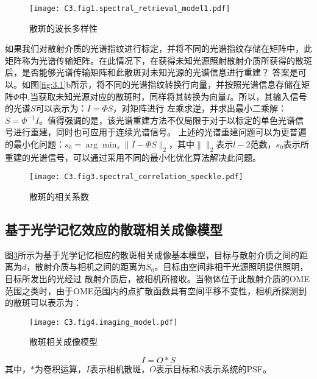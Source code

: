 \begin{figure}[htp]
	\centering
	\texttt{[image: C3.fig1.spectral\_retrieval\_model1.pdf]}
	\caption{散斑的波长多样性}
	\label{fig:3.2}
\end{figure}

如果我们对散射介质的光谱指纹进行标定，并将不同的光谱指纹存储在矩阵中，此矩阵称为光谱传输矩阵。在此情况下，在获得未知光源照射散射介质所获得的散斑后，是否能够光谱传输矩阵和此散斑对未知光源的光谱信息进行重建？
答案是可以。如图\ref{fig:3.1}b所示，将不同的光谱指纹转换行向量，并按照光谱信息存储在矩阵$\Phi$中,当获取未知光源对应的散斑时，同样将其转换为向量$I$。所以，其输入信号的光谱$S$可以表示为：$I={\Phi}S$，对矩阵进行
左乘求逆，并求出最小二乘解：$S={\Phi}^{-1}I$。值得强调的是，该光谱重建方法不仅局限于对于以标定的单色光谱信号进行重建，同时也可应用于连续光谱信号。
上述的光谱重建问题可以为更普遍的最小化问题：$s_{0}=\arg{\min_s \| I -{\Phi}S \|_2}$，其中$\|  \|_2$表示$l-2$范数，$s_{0}$表示所重建的光谱信号，可以通过采用不同的最小化优化算法解决此问题。
\begin{figure}[htp]
	\centering
	\texttt{[image: C3.fig3.spectral\_correlation\_speckle.pdf]}
	\caption{散斑的相关系数}
	\label{fig:3.3}
\end{figure}
\subsection{基于光学记忆效应的散斑相关成像模型}
图\ref{fig:3.4}所示为基于光学记忆相应的散斑相关成像基本模型，目标与散射介质之间的距离为$d$，散射介质与相机之间的距离为$S_{0}$。目标由空间非相干光源照明提供照明，目标所发出的光经过
散射介质后，被相机所接收。当物体位于此散射介质的OME范围之类时，由于OME范围内的点扩散函数具有空间平移不变性，相机所探测到的散斑可以表示为：
\begin{figure}[htp]
	\centering
	\texttt{[image: C3.fig4.imaging\_model.pdf]}
	\caption{散斑相关成像模型}
	\label{fig:3.4}
\end{figure}

\begin{equation}
    I = O*S
\label{eq:speckle_autocorrelation_imgaing}
\end{equation}其中，$*$为卷积运算，$I$表示相机散斑，$O$表示目标和$S$表示系统的PSF。

